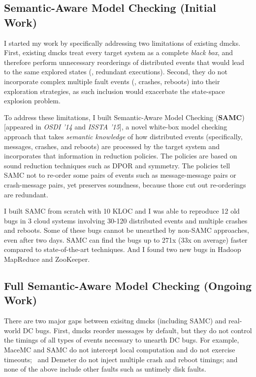 \documentclass[11pt]{article}
\begin{document}
\subsection{Semantic-Aware Model Checking (Initial Work)} 

I started my work by specifically addressing two limitations of existing dmcks.
First, existing dmcks treat every target system as a complete \textit{black
box}, and therefore perform unnecessary reorderings of distributed events that
would lead to the same explored states (\ie, redundant executions). Second, they
do not incorporate complex multiple fault events (\eg, crashes, reboots) into
their exploration strategies, as such inclusion would exacerbate the state-space
explosion problem.

To address these limitations, I built Semantic-Aware Model Checking
(\textbf{SAMC}) [appeared in \textit{OSDI '14} and \textit{ISSTA '15}], a novel
white-box model checking approach that takes \textit{semantic knowledge} of how
distributed events (specifically, messages, crashes, and reboots) are processed
by the target system and incorporates that information in reduction policies.
The policies are based on sound reduction techniques such as DPOR and symmetry.
The policies tell SAMC not to re-order some pairs of events such as
message-message pairs or crash-message pairs, yet preserves soundness, because
those cut out re-orderings are redundant.

I built SAMC from scratch with 10 KLOC and I was able to reproduce 12 old bugs
in 3 cloud systems involving 30-120 distributed events and multiple crashes and
reboots. Some of these bugs cannot be unearthed by non-SAMC approaches, even
after two days. SAMC can find the bugs up to 271x (33x on average) faster
compared to state-of-the-art techniques. And I found two new bugs in Hadoop
MapReduce and ZooKeeper.

\subsection{Full Semantic-Aware Model Checking (Ongoing Work)} 

There are two major gaps between exisitng dmcks (including SAMC) and real-world
DC bugs. First, dmcks reorder messages by default, but they do not control the
timings of all types of events necessary to unearth DC bugs. For example, MaceMC
and SAMC do not intercept local computation and do not exercise timeouts;
\modist\ and Demeter do not inject multiple crash and reboot timings; and none
of the above include other faults such as untimely disk faults.
\end{document}
